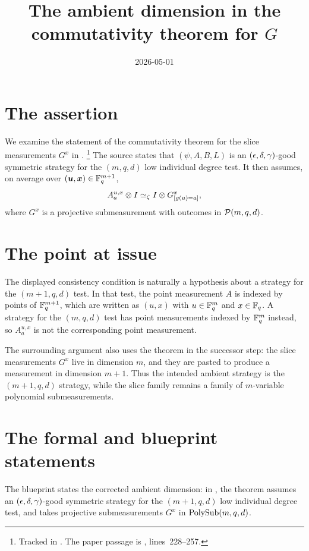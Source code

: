 \documentclass{article}
\title{The ambient dimension in the commutativity theorem for $G$}
\author{}
\date{2026-05-01}
\begin{document}
\maketitle

\section{The assertion}

We examine the statement of the commutativity theorem for the slice
measurements $G^x$ in \cite[Section~\emph{Commutativity of~$G$}]{Ji2020LowIndividualDegree}.%
\footnote{Tracked in . The paper passage is
, lines~228--257.}
The source states that $(\psi,A,B,L)$ is an
$(\epsilon,\delta,\gamma)$-good symmetric strategy for the $(m,q,d)$ low
individual degree test. It then assumes, on average over
$(\boldsymbol{u},{\boldsymbol{x}}) \in \mathbb{F}_q^{m+1}$,
\[
  A^{u,x}_a \otimes I \simeq_\zeta I \otimes G^x_{[g(u)=a]},
\]
where $G^x$ is a projective submeasurement with outcomes in
$\mathcal{P}(m, q, d)$.

\section{The point at issue}

The displayed consistency condition is naturally a hypothesis about a
strategy for the $(m+1,q,d)$ test. In that test, the point measurement
$A$ is indexed by points of $\mathbb{F}_q^{m+1}$, which are written as
$(u,x)$ with $u\in\mathbb{F}_q^m$ and $x\in\mathbb{F}_q$. A strategy for the
$(m,q,d)$ test has point measurements indexed by $\mathbb{F}_q^m$ instead, so
$A^{u,x}_a$ is not the corresponding point measurement.

The surrounding argument also uses the theorem in the successor step:
the slice measurements $G^x$ live in dimension $m$, and they are pasted
to produce a measurement in dimension $m+1$. Thus the intended ambient
strategy is the $(m+1,q,d)$ strategy, while the slice family remains a
family of $m$-variable polynomial submeasurements.

\section{The formal and blueprint statements}

The blueprint states the corrected ambient dimension: in
, the theorem
 assumes an $(\epsilon,\delta,\gamma)$-good symmetric
strategy for the $(m+1,q,d)$ low individual degree test, and takes
projective submeasurements $G^x$ in $\mathrm{PolySub}(m, q, d)$.
\end{document}
